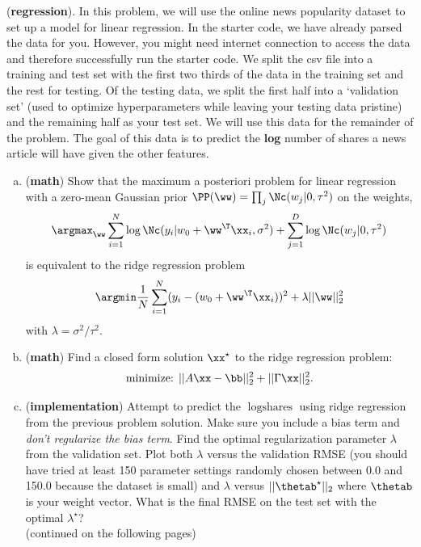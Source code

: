 \documentclass[12pt,letterpaper]{hmcpset}
\begin{document}
\begin{problem}[3]
	(\textbf{regression}). In this problem, we will use the online news popularity dataset to set up a model for linear regression. In the starter code, we have already parsed the data for you. However, you might need internet connection to access the data and therefore successfully run the starter code.
	\newline \newline
	We split the csv file into a training and test set with
	the first two thirds of the data in the training set and the rest for testing.
	Of the testing data, we split the first half into a `validation set' (used
	to optimize hyperparameters while leaving your testing data pristine) and
	the remaining half as your test set.
	We will use this data for the remainder of the problem. The goal of this data
	is to predict the \textbf{log} number of shares a news article will have given the other
	features.
	\newline \newline
	\begin{enumerate}[(a)]
		\item (\textbf{math}) Show that the maximum a posteriori problem for
		      linear regression with a zero-mean Gaussian prior $\PP(\ww) = \prod_j
			      \Nc(w_j | 0, \tau^2)$ on the weights,
		      \[
			      \argmax_\ww \sum_{i=1}^N \log\Nc(y_i | w_0 + \ww^\T\xx_i, \sigma^2) + \sum_{j=1}^D \log\Nc(w_j | 0, \tau^2)
		      \]
		      is equivalent to the ridge regression problem
		      \[
			      \argmin \frac{1}{N}\sum_{i=1}^N (y_i - (w_0 + \ww^\T\xx_i))^2 + \lambda ||\ww||_2^2
		      \]
		      with $\lambda = \sigma^2 / \tau^2$.
		      \newline
		\item (\textbf{math}) Find a closed form solution $\xx^\star$ to the ridge regression
		      problem:
		      \[
			      \text{minimize: } ||A\xx - \bb||_2^2 + ||\Gamma\xx||_2^2.
		      \]

		\item
		      (\textbf{implementation}) Attempt to predict the $\log\text{shares}$ using ridge
		      regression from the previous problem solution. Make sure you include a bias
		      term and \textit{don't regularize the bias term}.
		      Find the optimal regularization parameter $\lambda$
		      from the validation set. Plot both $\lambda$ versus the validation RMSE (you should have
		      tried at least 150 parameter settings randomly chosen between 0.0 and 150.0 because
		      the dataset is small)
		      and $\lambda$ versus $||\thetab^\star||_2$ where $\thetab$ is your weight vector.
		      What is the final RMSE on the test set with the optimal $\lambda^\star$?\\
		      \newline
		      (continued on the following pages)
	\end{enumerate}
\end{problem}
\begin{solution}
	\vfill
\end{solution}
\newpage
\end{document}
